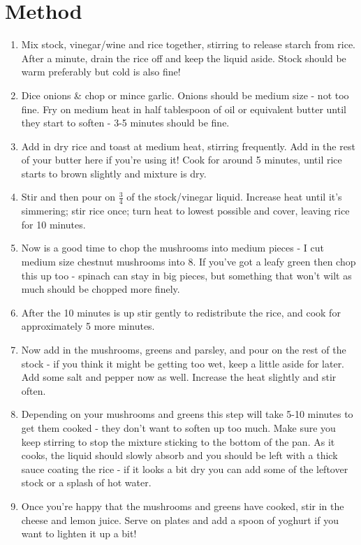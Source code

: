 \documentclass[10pt,a4paper]{article}
\begin{document}
	\section{Method}
	\begin{enumerate}
		\item Mix stock, vinegar/wine and rice together, stirring to release starch from rice. After a minute, drain the rice off and keep the liquid aside. Stock should be warm preferably but cold is also fine!
		\item Dice onions \& chop or mince garlic. Onions should be medium size - not too fine. Fry on medium heat in half tablespoon of oil or equivalent butter until they start to soften - 3-5 minutes should be fine.
		\item Add in dry rice and toast at medium heat, stirring frequently. Add in the rest of your butter here if you're using it! Cook for around 5 minutes, until rice starts to brown slightly and mixture is dry.
		\item Stir and then pour on $\frac{3}{4}$ of the stock/vinegar liquid. Increase heat until it's simmering; stir rice once; turn heat to lowest possible and cover, leaving rice for 10 minutes. 
		\item Now is a good time to chop the mushrooms into medium pieces - I cut medium size chestnut mushrooms into 8. If you've got a leafy green then chop this up too - spinach can stay in big pieces, but something that won't wilt as much should be chopped more finely.
		\item After the 10 minutes is up stir gently to redistribute the rice, and cook for approximately 5 more minutes.
		\item Now add in the mushrooms, greens and parsley, and pour on the rest of the stock - if you think it might be getting too wet, keep a little aside for later. Add some salt and pepper now as well. Increase the heat slightly and stir often.
		\item Depending on your mushrooms and greens this step will take 5-10 minutes to get them cooked - they don't want to soften up too much. Make sure you keep stirring to stop the mixture sticking to the bottom of the pan. As it cooks, the liquid should slowly absorb and you should be left with a thick sauce coating the rice - if it looks  a bit dry you can add some of the leftover stock or a splash of hot water.
		\item Once you're happy that the mushrooms and greens have cooked, stir in the cheese and lemon juice. Serve on plates and add a spoon of yoghurt if you want to lighten it up a bit!
	\end{enumerate}
\end{document}
